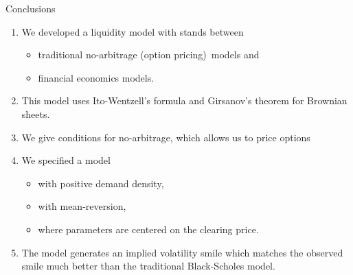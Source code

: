 \documentclass{beamer}
\begin{document}
\begin{frame}[shrink=25]{{\color{cyan}Conclusions}}
\bigskip
\begin{enumerate}
\item We developed a liquidity model with stands between
		\begin{itemize}
			\item traditional no-arbitrage (option pricing)\ models and
			\item financial economics models.
		\end{itemize}

\vspace{5pt}
\item This model uses Ito-Wentzell's formula and Girsanov's theorem for Brownian sheets.

\vspace{5pt}
\item We give conditions for no-arbitrage, which allows us to price options

\vspace{5pt}
\item We specified a model
		\begin{itemize}
			\item with positive demand density,
			\item with mean-reversion,
			\item where parameters are centered on the clearing price.
		\end{itemize}

\vspace{5pt}	
\item The model generates an implied volatility smile which matches the observed smile much better than the traditional Black-Scholes model.

\end{enumerate}
\end{frame}
\end{document}
